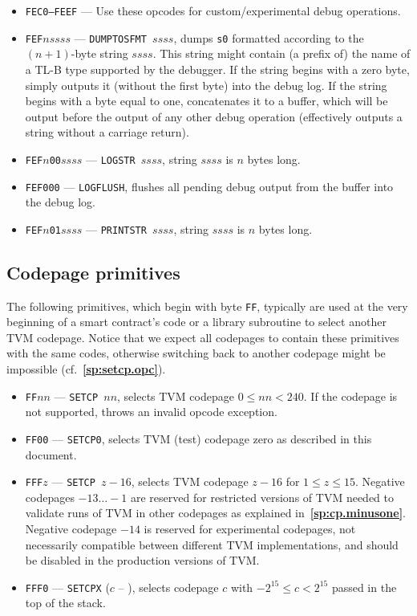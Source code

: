 \documentclass[12pt,oneside]{article}
\def\refpoint#1{{\rm\textbf{\ref{#1}}}}
\let\ptref=\refpoint
\def\mysubsection#1{\subsection{#1}\fancyhead[C]{\small{\textsc{\textrm{\thesubsection.} #1}}}}
\begin{document}
\begin{itemize}
\item {\tt FEC0--FEEF} --- Use these opcodes for custom/experimental debug operations.
\item {\tt FEF$nssss$} --- {\tt DUMPTOSFMT $ssss$}, dumps {\tt s0} formatted according to the $(n+1)$-byte string $ssss$. This string might contain (a prefix of) the name of a TL-B type supported by the debugger. If the string begins with a zero byte, simply outputs it (without the first byte) into the debug log. If the string begins with a byte equal to one, concatenates it to a buffer, which will be output before the output of any other debug operation (effectively outputs a string without a carriage return).
\item {\tt FEF$n$00$ssss$} --- {\tt LOGSTR $ssss$}, string $ssss$ is $n$ bytes long.
\item {\tt FEF000} --- {\tt LOGFLUSH}, flushes all pending debug output from the buffer into the debug log.
\item {\tt FEF$n$01$ssss$} --- {\tt PRINTSTR $ssss$}, string $ssss$ is $n$ bytes long.
\end{itemize}

\mysubsection{Codepage primitives}\label{p:prim.codepage}
The following primitives, which begin with byte {\tt FF}, typically are used at the very beginning of a smart contract's code or a library subroutine to select another TVM codepage. Notice that we expect all codepages to contain these primitives with the same codes, otherwise switching back to another codepage might be impossible (cf.~\ptref{sp:setcp.opc}).
\begin{itemize}
\item {\tt FF$nn$} --- {\tt SETCP $nn$}, selects TVM codepage $0\leq nn<240$. If the codepage is not supported, throws an invalid opcode exception.
\item {\tt FF00} --- {\tt SETCP0}, selects TVM (test) codepage zero as described in this document.
\item {\tt FFF$z$} --- {\tt SETCP $z-16$}, selects TVM codepage $z-16$ for $1\leq z\leq 15$. Negative codepages $-13\ldots-1$ are reserved for restricted versions of TVM needed to validate runs of TVM in other codepages as explained in~\ptref{sp:cp.minusone}. Negative codepage $-14$ is reserved for experimental codepages, not necessarily compatible between different TVM implementations, and should be disabled in the production versions of TVM.
\item {\tt FFF0} --- {\tt SETCPX} ($c$ -- ), selects codepage $c$ with $-2^{15}\leq c<2^{15}$ passed in the top of the stack.
\end{itemize}
\end{document}
